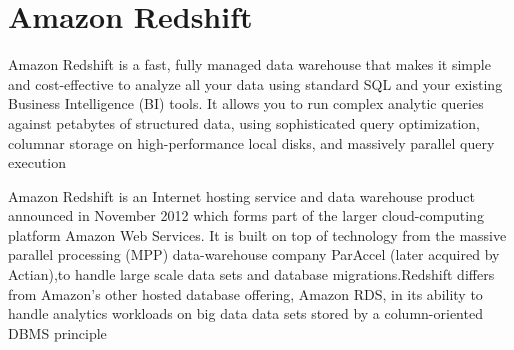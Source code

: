 \section{Amazon Redshift}

Amazon Redshift is a fast, fully managed data warehouse that makes it simple 
and cost-effective to analyze all your data using standard SQL and your 
existing Business Intelligence (BI) tools. It allows you to run complex 
analytic queries against petabytes of structured data, using sophisticated 
query optimization, columnar storage on high-performance local disks, and 
massively parallel query execution \cite{Amazon Redshift}

Amazon Redshift is an Internet hosting service and data warehouse product 
announced in November 2012 which forms part of the larger cloud-computing 
platform Amazon Web Services. It is built on top of technology from the 
massive parallel processing (MPP) data-warehouse company ParAccel 
(later acquired by Actian),to handle large scale data sets and database 
migrations.Redshift differs from Amazon's other hosted database offering, 
Amazon RDS, in its ability to handle analytics workloads on big data data sets 
stored by a column-oriented DBMS principle \cite{AmazonWiki}


